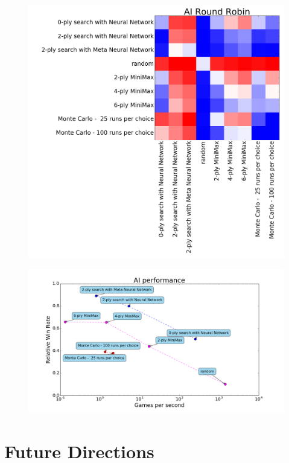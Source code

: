 \begin{frame}
\begin{figure}
\includegraphics[width=0.70 \textwidth]{round_robin}
\end{figure}
\end{frame}

\begin{frame}
\begin{figure}
\includegraphics[width=1.0 \textwidth]{performance}
\end{figure}
\end{frame}
\section{Future Directions}
